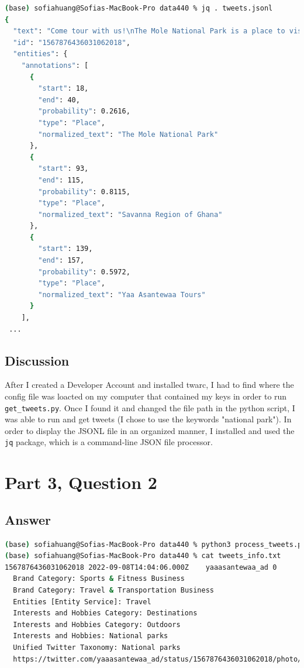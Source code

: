 \documentclass[12pt]{article}
\begin{document}
\begin{lstlisting}[language=bash, caption=tweets.jsonl output snippet, label=lst:copy]
(base) sofiahuang@Sofias-MacBook-Pro data440 % jq . tweets.jsonl 
{
  "text": "Come tour with us!\nThe Mole National Park is a place to visit and experience wildlife in the Savanna Region of Ghana.\nNature is beautiful, Yaa Asantewaa Tours is here for you!!\nContact us anytime for adventurous and exciting tours.\n0209079288\nyaaahendea@gmail.com\n#pulseofafrica https://t.co/YhUHPGdUTO",
  "id": "1567876436031062018",
  "entities": {
    "annotations": [
      {
        "start": 18,
        "end": 40,
        "probability": 0.2616,
        "type": "Place",
        "normalized_text": "The Mole National Park"
      },
      {
        "start": 93,
        "end": 115,
        "probability": 0.8115,
        "type": "Place",
        "normalized_text": "Savanna Region of Ghana"
      },
      {
        "start": 139,
        "end": 157,
        "probability": 0.5972,
        "type": "Place",
        "normalized_text": "Yaa Asantewaa Tours"
      }
    ],
 ...
\end{lstlisting}


\subsection*{Discussion}

After I created a Developer Account and installed twarc, I had to find where the config file was loacted on my computer that contained my keys in order to run \lstinline{get_tweets.py}. Once I found it and changed the file path in the python script, I was able to run and get tweets (I chose to use the keywords "national park"). In order to display the JSONL file in an organized manner, I installed and used the \lstinline{jq} package, which is a command-line JSON file processor.

\section*{Part 3, Question 2}

\subsection*{Answer}

\begin{lstlisting}[language=bash, caption=tweets\_info.txt output snippet, label=lst:copy]
(base) sofiahuang@Sofias-MacBook-Pro data440 % python3 process_tweets.py < tweets.jsonl > tweets_info.txt
(base) sofiahuang@Sofias-MacBook-Pro data440 % cat tweets_info.txt
1567876436031062018	2022-09-08T14:04:06.000Z	yaaasantewaa_ad	0
  Brand Category: Sports & Fitness Business
  Brand Category: Travel & Transportation Business
  Entities [Entity Service]: Travel
  Interests and Hobbies Category: Destinations
  Interests and Hobbies Category: Outdoors
  Interests and Hobbies: National parks
  Unified Twitter Taxonomy: National parks
  https://twitter.com/yaaasantewaa_ad/status/1567876436031062018/photo/1
\end{lstlisting}
\end{document}
